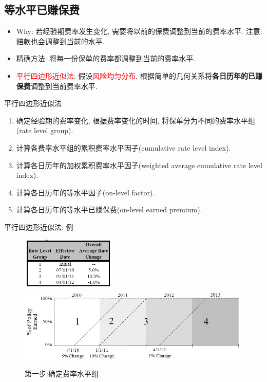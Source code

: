 \documentclass[professionalfont]{beamer}
\newcommand{\red}[1]{\textcolor{red}{#1}}
\newcommand{\green}[1]{\textbf{#1}}
\begin{document}
\subsection{等水平已赚保费}
\begin{frame}
\begin{itemize}
\item Why: 若经验期费率发生变化, 需要将以前的保费调整到当前的费率水平. 注意: 赔款也会调整到当前的水平.
\item 精确方法: 将每一份保单的费率都调整到当前的费率水平.
\item \red{平行四边形近似法}: 假设\red{风险均匀分布}, 根据简单的几何关系将\green{各日历年的已赚保费}调整到当前费率水平.
\end{itemize}
\end{frame}
\begin{frame}{平行四边形近似法}
	\begin{enumerate}
		\item 确定经验期的费率变化, 根据费率变化的时间, 将保单分为不同的费率水平组 (rate level group).
		\item 计算各费率水平组的累积费率水平因子(cumulative rate level index).
		\item 计算各日历年的加权累积费率水平因子(weighted average cumulative rate level index).
		\item 计算各日历年的等水平因子(on-level factor).
		\item 计算各日历年的等水平已赚保费(on-level earned premium).
	\end{enumerate}
\end{frame}
\begin{frame}{平行四边形近似法: 例}
	\begin{figure}
		\includegraphics[width=0.4\textwidth]{Plots/on_level_1.jpg}\\
		\includegraphics[width=1\textwidth]{Plots/on_level_2.jpg}

		\caption{第一步:确定费率水平组}
					\label{on_level}
		\end{figure}
\end{frame}
\end{document}
